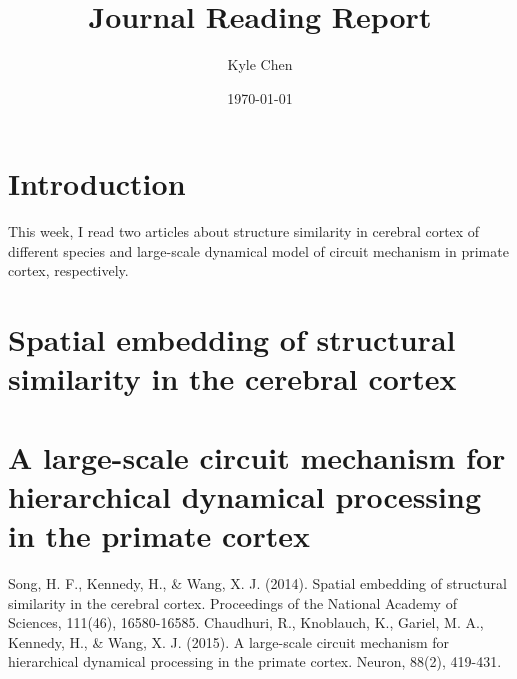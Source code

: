 \documentclass{article}[12pt]
\begin{document}
\title{Journal Reading Report}
\author{Kyle Chen}
\date{\today}

\maketitle
\tableofcontents

\section{Introduction}
This week, I read two articles about structure similarity in cerebral cortex of different species and large-scale dynamical model of circuit mechanism in primate cortex, respectively.

\section{Spatial embedding of structural similarity in the cerebral cortex} \cite{Song2014}


\section{A large-scale circuit mechanism for hierarchical dynamical processing in the primate cortex}\cite{Chaudhuri2015}

\begin{thebibliography}{0}
	Song, H. F., Kennedy, H., \& Wang, X. J. (2014). Spatial embedding of structural similarity in the cerebral cortex. Proceedings of the National Academy of Sciences, 111(46), 16580-16585.
	Chaudhuri, R., Knoblauch, K., Gariel, M. A., Kennedy, H., \& Wang, X. J. (2015). A large-scale circuit mechanism for hierarchical dynamical processing in the primate cortex. Neuron, 88(2), 419-431.

\end{thebibliography}
\end{document}
